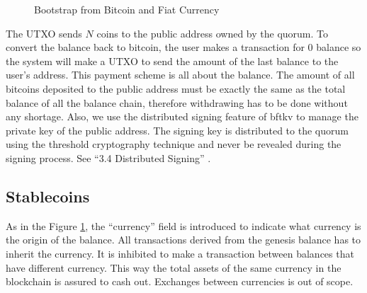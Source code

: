 \documentclass[10pt,fleqn]{article}
\begin{document}
\begin{figure}[H]
\begin{center}
\end{center}
\label{bootstrap}
\caption{Bootstrap from Bitcoin and Fiat Currency}
\end{figure}

The UTXO sends $N$ coins to the public address owned by the quorum. To convert the balance back to bitcoin, the user makes a transaction for $0$ balance so the system will make a UTXO to send the amount of the last balance to the user's address.
This payment scheme is all about the balance. The amount of all bitcoins deposited to the public address must be exactly the same as the total balance of all the balance chain, therefore withdrawing has to be done without any shortage.
Also, we use the distributed signing feature of {\sf bftkv} to manage the private key of the public address. The signing key is distributed to the quorum using the threshold cryptography technique and never be revealed during the signing process. See ``3.4 Distributed Signing'' \cite{bftkv}.

\subsection{Stablecoins}
As in the Figure \ref{bootstrap}, the ``currency'' field is introduced to indicate what currency is the origin of the balance. All transactions derived from the genesis balance has to inherit the currency. It is inhibited to make a transaction between balances that have different currency. This way the total assets of the same currency in the blockchain is assured to cash out. Exchanges between currencies is out of scope.
\end{document}
